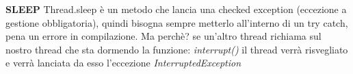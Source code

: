 \noindent \textbf{SLEEP} \newline
Thread.sleep è un metodo che lancia una checked exception (eccezione a gestione obbligatoria), quindi bisogna sempre metterlo all'interno di un try catch, pena un errore in compilazione. Ma perchè? se un'altro thread richiama sul nostro thread che sta dormendo la funzione: \textit{interrupt()} il thread verrà risvegliato e verrà lanciata da esso l'eccezione \textit{InterruptedException}
 

 
